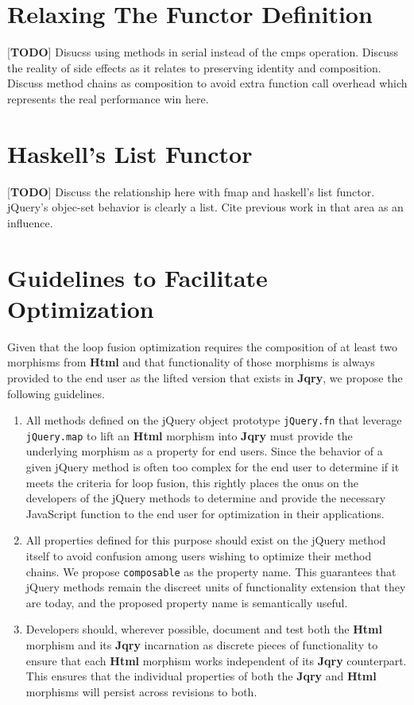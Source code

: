 \documentclass[preprint, leqno]{sigplanconf}
\begin{document}
\section{Relaxing The Functor Definition}

[\textbf{TODO}] Disucss using methods in serial instead of the cmps operation. Discuss the reality of side effects as it relates to preserving identity and composition. Discuss method chains as composition to avoid extra function call overhead which represents the real performance win here.

\section{Haskell's List Functor}

[\textbf{TODO}] Discuss the relationship here with fmap and haskell's list functor. jQuery's objec-set behavior is clearly a list. Cite previous work in that area as an influence.

\section{Guidelines to Facilitate Optimization}

Given that the loop fusion optimization requires the composition of at least two morphisms from \textbf{Html} and that functionality of those morphisms is always provided to the end user as the lifted version that exists in \textbf{Jqry}, we propose the following guidelines.

\begin{enumerate}
  \item \label{item:standard-1} All methods defined on the jQuery object prototype \verb|jQuery.fn| that leverage \verb|jQuery.map| to lift an \textbf{Html} morphism into \textbf{Jqry} must provide the underlying morphism as a property for end users. Since the behavior of a given jQuery method is often too complex for the end user to determine if it meets the criteria for loop fusion, this rightly places the onus on the developers of the jQuery methods to determine and provide the necessary JavaScript function to the end user for optimization in their applications.
  \item \label{item:standard-2} All properties defined for this purpose should exist on the jQuery method itself to avoid confusion among users wishing to optimize their method chains. We propose \verb|composable| as the property name. This guarantees that jQuery methods remain the discreet units of functionality extension that they are today, and the proposed property name is semantically useful.
  \item \label{item:standard-3}Developers should, wherever possible, document and test both the \textbf{Html} morphism and its \textbf{Jqry} incarnation as discrete pieces of functionality to ensure that each \textbf{Html} morphism works independent of its \textbf{Jqry} counterpart. This ensures that the individual properties of both the \textbf{Jqry} and \textbf{Html} morphisms will persist across revisions to both.
\end{enumerate}
\end{document}
